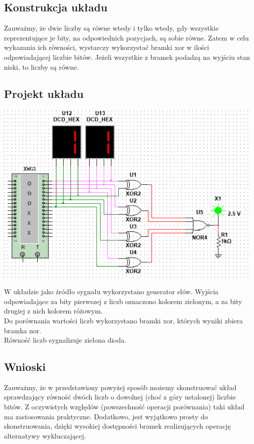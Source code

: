 \documentclass{article}
\begin{document}
        \subsection{Konstrukcja układu}
            Zauważmy, że dwie liczby są równe wtedy i tylko wtedy, gdy wszystkie reprezentujące je bity, na odpowiednich pozycjach, są sobie równe. Zatem w celu wykazania ich równości, wystarczy wykorzystać bramki xor w ilości odpowiadającej liczbie bitów. Jeżeli wszystkie z bramek podadzą na wyjściu stan niski, to liczby są równe.

        \subsection{Projekt układu}
            \begin{center}
                \includegraphics[height=9cm]{reports/img/Z1B_1.png}\\
            \end{center}
            W układzie jako źródło sygnału wykorzystano generator słów. Wyjścia odpowiadające za bity pierwszej z liczb oznaczono kolorem zielonym, a za bity drugiej z nich kolorem różowym. \\
            Do porównania wartości liczb wykorzystano bramki xor, których wyniki zbiera bramka nor. \\
            Równość liczb sygnalizuje zielona dioda. 
            \FloatBarrier
            
        \subsection{Wnioski}
            Zauważmy, że w przedstawiony powyżej sposób możemy skonstruować układ sprawdzający równość  dwóch liczb o dowolnej (choć z góry ustalonej) liczbie bitów. Z oczywistych względów (powszechność operacji porównania) taki układ ma zastosowania praktyczne. Dodatkowo, jest wyjątkowo prosty do skonstruowania, dzięki wysokiej dostępności bramek realizujących operację alternatywy wykluczającej. 
\end{document}
